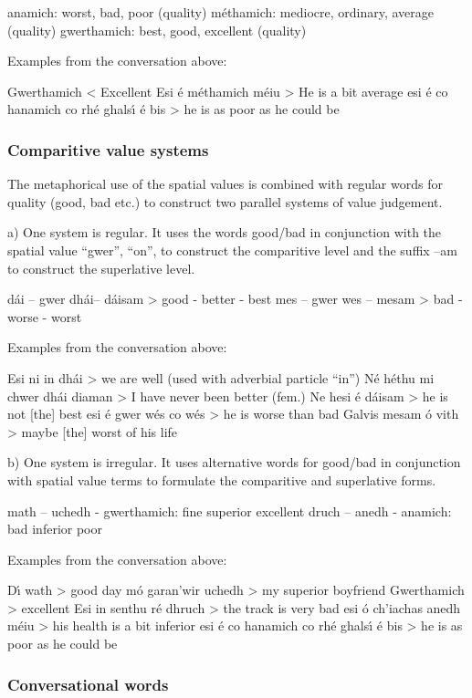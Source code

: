          anamich: worst, bad, poor (quality) 
        m\'{e}thamich: mediocre, ordinary, average (quality) 
        gwerthamich: best, good, excellent (quality) 

Examples from the conversation above:

Gwerthamich < Excellent
Esi \'{e} m\'{e}thamich m\'{e}iu > He is a bit average
esi \'{e} co hanamich co rh\'{e} ghals\'{\i} \'{e} bis > he is as poor as he could be


\subsubsection{Comparitive value systems}

The metaphorical use of the spatial values is combined with regular words for quality (good, bad etc.) to construct two parallel systems of value judgement. 

a) One system is regular. It uses the words good/bad in conjunction with the spatial value “gwer”, “on”, to construct the comparitive level and the suffix –am to construct the superlative level.

        d\'{a}i – gwer dh\'{a}i– d\'{a}isam > good - better - best
        mes – gwer wes – mesam > bad - worse - worst

Examples from the conversation above:

Esi ni in dh\'{a}i > we are well (used with adverbial particle “in”)
N\'{e} h\'{e}thu mi chwer dh\'{a}i diaman > I have never been better (fem.)
Ne hesi \'{e} d\'{a}isam > he is not [the] best
esi \'{e} gwer w\'{e}s co w\'{e}s > he is worse than bad
Galvis mesam \'{o} vith > maybe [the] worst of his life

b) One system is irregular. It uses alternative words for good/bad in conjunction with spatial value terms to formulate the comparitive and superlative forms.

        math –  uchedh   -  gwerthamich: fine       superior     excellent
        druch – anedh -    anamich: bad       inferior    poor

Examples from the conversation above:

D\'{\i} wath > good day
m\'{o} garan’wir uchedh > my superior boyfriend
Gwerthamich > excellent
Esi in senthu r\'{e} dhruch > the track is very bad
esi \'{o} ch’iachas anedh m\'{e}iu > his health is a bit inferior
esi \'{e} co hanamich co rh\'{e} ghals\'{\i} \'{e} bis > he is as poor as he could be

\subsubsection{Conversational words}

